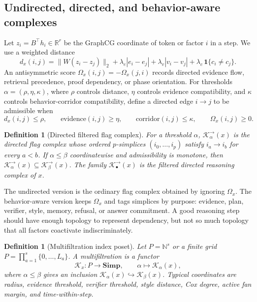 \documentclass[10pt]{article}
\newtheorem{definition}[theorem]{Definition}
\newcommand{\RR}{\mathbb{R}}
\newcommand{\NN}{\mathbb{N}}
\newcommand{\calK}{\mathcal{K}}
\numberwithin{equation}{section}
\begin{document}
\subsection{Undirected, directed, and behavior-aware complexes}
Let $z_i=B^\top h_i\in\RR^r$ be the GraphCG coordinate of token or factor $i$ in a step. We use a weighted distance
\begin{equation}
d_x(i,j)=\|W(z_i-z_j)\|_2+\lambda_e |e_i-e_j|+\lambda_v |v_i-v_j|+\lambda_c\,\mathbf{1}\{c_i\ne c_j\}.
\end{equation}
An antisymmetric score $\Omega_x(i,j)=-\Omega_x(j,i)$ records directed evidence flow, retrieval precedence, proof dependency, or phase orientation. For thresholds $\alpha=(\rho,\eta,\kappa)$, where $\rho$ controls distance, $\eta$ controls evidence compatibility, and $\kappa$ controls behavior-corridor compatibility, define a directed edge $i\to j$ to be admissible when
\begin{equation}
d_x(i,j)\le \rho,
\qquad
\mathrm{evidence}(i,j)\ge \eta,
\qquad
\mathrm{corridor}(i,j)\le \kappa,
\qquad
\Omega_x(i,j)\ge 0.
\end{equation}

\begin{definition}[Directed filtered flag complex]
For a threshold $\alpha$, $\calK_\alpha^\to(x)$ is the directed flag complex whose ordered $p$-simplices $(i_0,\ldots,i_p)$ satisfy $i_a\to i_b$ for every $a<b$. If $\alpha\le \beta$ coordinatewise and admissibility is monotone, then $\calK_\alpha^\to(x)\subseteq \calK_\beta^\to(x)$. The family $\calK_\bullet^\to(x)$ is the filtered directed reasoning complex of $x$.
\end{definition}

The undirected version is the ordinary flag complex obtained by ignoring $\Omega_x$. The behavior-aware version keeps $\Omega_x$ and tags simplices by purpose: evidence, plan, verifier, style, memory, refusal, or answer commitment. A good reasoning step should have enough topology to represent dependency, but not so much topology that all factors coactivate indiscriminately.

\begin{definition}[Multifiltration index poset]
Let $P=\NN^s$ or a finite grid $P=\prod_{a=1}^s\{0,\ldots,L_a\}$. A multifiltration is a functor
\begin{equation}
\calK_x:P\to \mathbf{Simp},\qquad \alpha\mapsto \calK_\alpha(x),
\end{equation}
where $\alpha\le\beta$ gives an inclusion $\calK_\alpha(x)\hookrightarrow\calK_\beta(x)$. Typical coordinates are radius, evidence threshold, verifier threshold, style distance, Cox degree, active fan margin, and time-within-step.
\end{definition}
\end{document}
